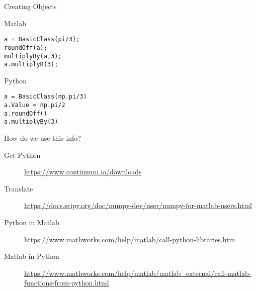 \documentclass[xcolor={dvipsnames}]{beamer}
\begin{document}
\begin{frame}[fragile]{Creating Objects}

\begin{block}{Matlab}
\begin{verbatim}
a = BasicClass(pi/3);
roundOff(a);
multiplyBy(a,3);
a.multiplyB(3);
\end{verbatim}
\end{block}
\begin{block}{Python}
\begin{verbatim}
a = BasicClass(np.pi/3)
a.Value = np.pi/2
a.roundOff()
a.multiplyBy(3)
\end{verbatim}
\end{block}
\end{frame}

\begin{frame}{How do we use this info?}
\begin{description}
\item[Get Python]
\url{https://www.continuum.io/downloads}
\item[Translate]
\url{https://docs.scipy.org/doc/numpy-dev/user/numpy-for-matlab-users.html}
\item[Python in Matlab] \url{https://www.mathworks.com/help/matlab/call-python-libraries.htm}
\item[Matlab in Python]
\url{https://www.mathworks.com/help/matlab/matlab_external/call-matlab-functions-from-python.html}
\end{description}
\end{frame}
\end{document}
